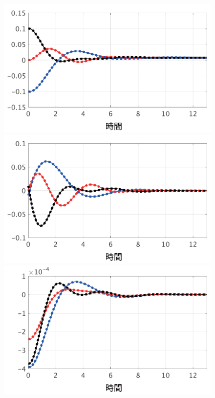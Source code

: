 \documentclass[tombow,dvipdfmx]{corona-a5}
\begin{document}
\begin{figure}[t]
  \centering
  {
  \begin{minipage}{0.32\linewidth}
    \centering
    \includegraphics[width = .99\linewidth]{figs/deltasp}
  \end{minipage}
  \begin{minipage}{0.32\linewidth}
    \centering
    \includegraphics[width = .99\linewidth]{figs/omegasp}
  \end{minipage}
  \begin{minipage}{0.32\linewidth}
    \centering
    \includegraphics[width = .99\linewidth]{figs/Esp}

\end{minipage}}
\end{figure}
\end{document}
